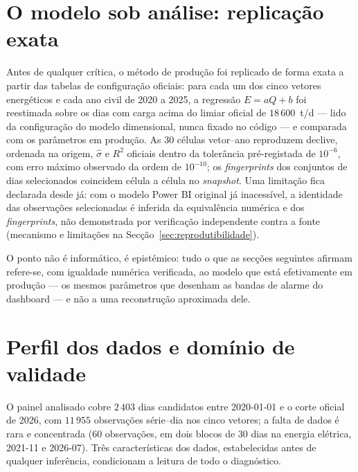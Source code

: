 \section{O modelo sob análise: replicação exata}
\label{sec:replicacao}

Antes de qualquer crítica, o método de produção foi replicado de forma exata a
partir das tabelas de configuração oficiais: para cada um dos cinco vetores
energéticos e cada ano civil de 2020 a 2025, a regressão $E = aQ + b$ foi
reestimada sobre os dias com carga acima do limiar oficial de
$18\,600$~t/d --- lido da configuração do modelo dimensional, nunca fixado no
código --- e comparada com os parâmetros em produção. As 30 células
vetor--ano reproduzem declive, ordenada na origem, $\hat\sigma$ e $R^2$
oficiais dentro da tolerância pré-registada de $10^{-6}$, com erro máximo
observado da ordem de $10^{-10}$; os \emph{fingerprints} dos conjuntos de
dias selecionados coincidem célula a célula no \emph{snapshot}. Uma
limitação fica declarada desde já: com o modelo Power BI original já
inacessível, a identidade das observações selecionadas é inferida da
equivalência numérica e dos \emph{fingerprints}, não demonstrada por
verificação independente contra a fonte
(mecanismo e limitações na Secção~\ref{sec:reprodutibilidade}).

O ponto não é informático, é epistémico: tudo o que as secções seguintes
afirmam refere-se, com igualdade numérica verificada, ao modelo que está
efetivamente em produção --- os mesmos parâmetros que desenham as bandas de
alarme do dashboard --- e não a uma reconstrução aproximada dele.

\section{Perfil dos dados e domínio de validade}
\label{sec:perfil-dados}


O painel analisado cobre $2\,403$ dias candidatos entre 2020-01-01 e o corte
oficial de 2026, com $11\,955$ observações série--dia nos cinco vetores; a
falta de dados é rara e concentrada (60 observações, em dois blocos de 30 dias
na energia elétrica, 2021-11 e 2026-07). Três características dos dados,
estabelecidas antes de qualquer inferência, condicionam a leitura de todo o
diagnóstico.

